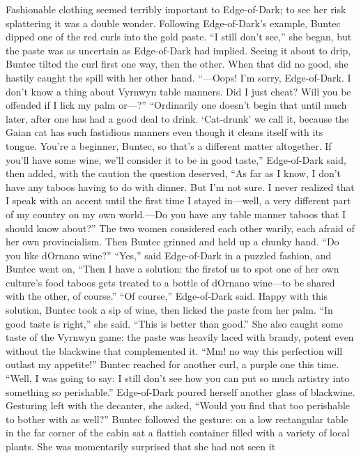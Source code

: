 \documentclass[9pt]{article}
\begin{document}
Fashionable clothing seemed terribly important to Edge-of-Dark; to see her risk splattering it was a
double wonder.
Following Edge-of-Dark’s example, Buntec dipped one of the red curls into the gold paste. “I still
don’t see,” she began, but the paste was as uncertain as Edge-of-Dark had implied. Seeing it about to
drip, Buntec tilted the curl first one way, then the other. When that did no good, she hastily caught the
spill with her other hand. “—Oops! I’m sorry, Edge-of-Dark. I don’t know a thing about Vyrnwyn table
manners. Did I just cheat? Will you be offended if I lick my palm or—?”
“Ordinarily one doesn’t begin that until much later, after one has had a good deal to drink.
‘Cat-drunk’ we call it, because the Gaian cat has such fastidious manners even though it cleans itself with
its tongue. You’re a beginner, Buntec, so that’s a different matter altogether. If you’ll have some wine,
we’ll consider it to be in good taste,” Edge-of-Dark said, then added, with the caution the question
deserved, “As far as I know, I don’t have any taboos having to do with dinner. But I’m not sure. I never
realized that I speak with an accent until the first time I stayed in—well, a very different part of my
country on my own world.—Do you have any table manner taboos that I should know about?”
The two women considered each other warily, each afraid of her own provincialism. Then Buntec
grinned and held up a chunky hand. “Do you like dOrnano wine?”
“Yes,” said Edge-of-Dark in a puzzled fashion, and Buntec went on, “Then I have a solution: the firstof us to spot one of her own culture’s food taboos gets treated to a bottle of dOrnano wine—to be
shared with the other, of course.”
“Of course,” Edge-of-Dark said.
Happy with this solution, Buntec took a sip of wine, then licked the paste from her palm. “In good
taste is right,” she said. “This is better than good.” She also caught some taste of the Vyrnwyn game: the
paste was heavily laced with brandy, potent even without the blackwine that complemented it.
“Mm! no way this perfection will outlast my appetite!” Buntec reached for another curl, a purple one
this time. “Well, I was going to say: I still don’t see how you can put so much artistry into something so
perishable.”
Edge-of-Dark poured herself another glass of blackwine. Gesturing left with the decanter, she asked,
“Would you find that too perishable to bother with as well?”
Buntec followed the gesture: on a low rectangular table in the far corner of the cabin sat a flattish
container filled with a variety of local plants. She was momentarily surprised that she had not seen it
\end{document}
